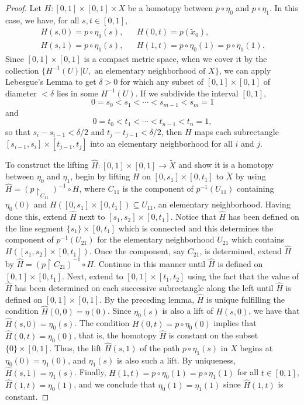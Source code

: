\begin{proof}
Let $H : [0,1] \times [0,1] \times X$ be a homotopy between $p \circ \eta_0$ and $p \circ \eta_1$. In this case, we have, for all $s,t \in [0,1]$,
\begin{align*}
H(s,0) = p \circ \eta_0(s), && H(0,t) = p(\tilde x_0),\\
H(s,1) = p \circ \eta_1(s), && H(1,t) = p \circ \eta_0(1) = p \circ \eta_1(1).
\end{align*}
Since $[0,1] \times [0,1]$ is a compact metric space, when we cover it by the collection $\{ H^{-1}(U) | U, \textrm{ an elementary neighborhood of } X \}$, we can apply Lebesgue's Lemma to get
$\delta > 0$ for which any subset of $[0,1] \times [0,1]$ of diameter $< \delta$ lies in some $H^{-1}(U)$. If we subdivide the interval $[0,1]$,
$$0 = s_0 < s_1 < \cdots < s_{m-1} < s_m = 1$$
and
$$0 = t_0 < t_1 < \cdots < t_{n-1} < t_n = 1,$$
so that $s_i - s_{i-1} < \delta / 2$ and $t_j - t_{j-1} < \delta / 2$, then $H$ maps each subrectangle $[s_{i-1},s_i] \times [t_{j-1},t_j]$ into an elementary neighborhood for all $i$ and $j$.

To construct the lifting $\hat{H} : [0,1] \times [0,1] \rightarrow \tilde X$ and show it is a homotopy between $\eta_0$ and $\eta_1$, begin by lifting $H$ on $[0,s_1] \times [0,t_1]$ to $\tilde X$
by using $\hat{H} = (p \upharpoonright_{C_{11}})^{-1} \circ H$, where $C_{11}$ is the component of $p^{-1}(U_{11})$ containing $\eta_0(0)$ and $H([0,s_1] \times [0,t_1]) \subseteq U_{11}$, an elementary
neighborhood. Having done this, extend $\hat{H}$ next to $[s_1,s_2] \times [0,t_1]$. Notice that $\hat{H}$ has been defined on the line segment $\{s_1\} \times [0,t_1]$ which is connected and this determines the component of
$p^{-1}(U_{21})$ for the elementary neighborhood $U_{21}$ which contains $H([s_1,s_2]\times[0,t_1])$. Once the component, say $C_{21}$, is determined, extend $\hat{H}$ by $\hat{H} = (p \upharpoonright C_{21})^{-1} \circ H$.
Continue in this manner until $\hat{H}$ is defined on $[0,1] \times [0,t_1]$. Next, extend to $[0,1] \times [t_1, t_2]$ using the fact that the value of $\hat{H}$ has been determined on each successive subrectangle along the left
until $\hat{H}$ is defined on $[0,1] \times [0,1]$. By the preceding lemma, $\hat{H}$ is unique fulfilling the condition $\hat{H}(0,0) = \eta(0)$. Since $\eta_0(s)$ is also a lift of $H(s,0)$, we have that $\hat{H}(s,0) = \eta_0(s)$.
The condition $H(0,t) = p \circ \eta_0(0)$ implies that $\hat{H}(0,t) = \eta_0(0)$, that is, the homotopy $\hat{H}$ is constant on the subset $\{0\} \times [0,1]$. Thus, the lift $\hat{H}(s,1)$ of the path $p \circ \eta_1(s)$ in $X$
begins at $\eta_0(0) = \eta_1(0)$, and $\eta_1(s)$ is also such a lift. By uniqueness, $\hat{H}(s,1) = \eta_1(s)$. Finally, $H(1,t) = p \circ \eta_0(1) = p \circ \eta_1(1)$ for all $t \in [0,1]$,
$\hat{H}(1,t) = \eta_0(1)$, and we conclude that $\eta_0(1) = \eta_1(1)$ since $\hat{H}(1,t)$ is constant.
\end{proof}

